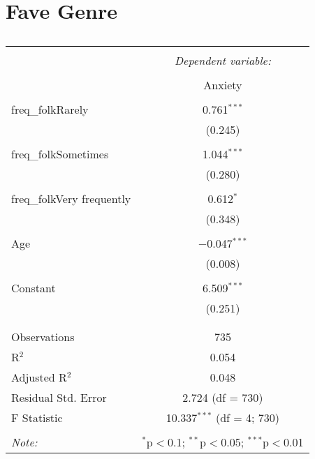 \documentclass{article}
\begin{document}
\newpage

\section{Fave Genre}






\begin{table}[!htbp] \centering 
  \caption{} 
  \label{} 
\begin{tabular}{@{\extracolsep{5pt}}lc} 
\\[-1.8ex]\hline 
\hline \\[-1.8ex] 
 & \multicolumn{1}{c}{\textit{Dependent variable:}} \\ 
\cline{2-2} 
\\[-1.8ex] & Anxiety \\ 
\hline \\[-1.8ex] 
 freq\_folkRarely & 0.761$^{***}$ \\ 
  & (0.245) \\ 
  & \\ 
 freq\_folkSometimes & 1.044$^{***}$ \\ 
  & (0.280) \\ 
  & \\ 
 freq\_folkVery frequently & 0.612$^{*}$ \\ 
  & (0.348) \\ 
  & \\ 
 Age & $-$0.047$^{***}$ \\ 
  & (0.008) \\ 
  & \\ 
 Constant & 6.509$^{***}$ \\ 
  & (0.251) \\ 
  & \\ 
\hline \\[-1.8ex] 
Observations & 735 \\ 
R$^{2}$ & 0.054 \\ 
Adjusted R$^{2}$ & 0.048 \\ 
Residual Std. Error & 2.724 (df = 730) \\ 
F Statistic & 10.337$^{***}$ (df = 4; 730) \\ 
\hline 
\hline \\[-1.8ex] 
\textit{Note:}  & \multicolumn{1}{r}{$^{*}$p$<$0.1; $^{**}$p$<$0.05; $^{***}$p$<$0.01} \\ 
\end{tabular} 
\end{table} 
\end{document}
